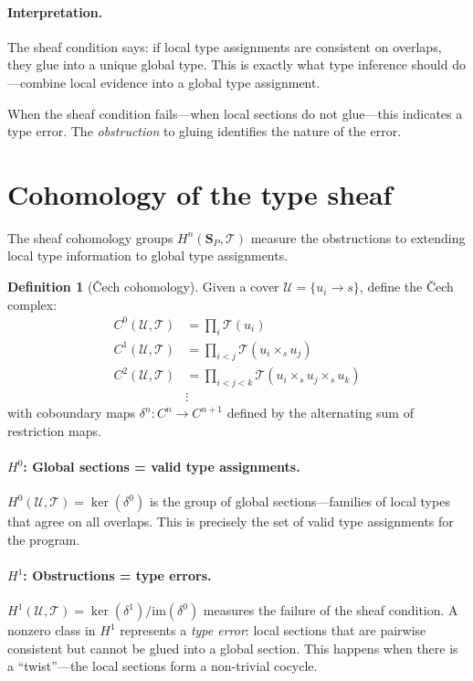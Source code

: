 \documentclass[11pt]{report}
\theoremstyle{definition}
\newtheorem{definition}{Definition}[section]
\theoremstyle{plain}
\begin{document}
\paragraph{Interpretation.}
The sheaf condition says: if local type assignments are consistent on
overlaps, they glue into a unique global type. This is exactly what type
inference should do---combine local evidence into a global type assignment.

When the sheaf condition fails---when local sections do not glue---this
indicates a type error. The \emph{obstruction} to gluing identifies the
nature of the error.

\section{Cohomology of the type sheaf}

The sheaf cohomology groups $H^n(\mathbf{S}_P, \mathcal{T})$ measure the
obstructions to extending local type information to global type assignments.

\begin{definition}[\v{C}ech cohomology]
Given a cover $\mathcal{U} = \{u_i \to s\}$, define the \v{C}ech complex:
\begin{align*}
  C^0(\mathcal{U}, \mathcal{T}) &= \prod_i \mathcal{T}(u_i) \\
  C^1(\mathcal{U}, \mathcal{T}) &= \prod_{i < j} \mathcal{T}(u_i \times_s u_j) \\
  C^2(\mathcal{U}, \mathcal{T}) &= \prod_{i < j < k}
    \mathcal{T}(u_i \times_s u_j \times_s u_k) \\
  &\vdots
\end{align*}
with coboundary maps $\delta^n : C^n \to C^{n+1}$ defined by the alternating
sum of restriction maps.
\end{definition}

\paragraph{$H^0$: Global sections = valid type assignments.}
$H^0(\mathcal{U}, \mathcal{T}) = \ker(\delta^0)$ is the group of global
sections---families of local types that agree on all overlaps. This is
precisely the set of valid type assignments for the program.

\paragraph{$H^1$: Obstructions = type errors.}
$H^1(\mathcal{U}, \mathcal{T}) = \ker(\delta^1) / \mathrm{im}(\delta^0)$
measures the failure of the sheaf condition. A nonzero class in $H^1$
represents a \emph{type error}: local sections that are pairwise consistent
but cannot be glued into a global section. This happens when there is a
``twist''---the local sections form a non-trivial cocycle.
\end{document}
